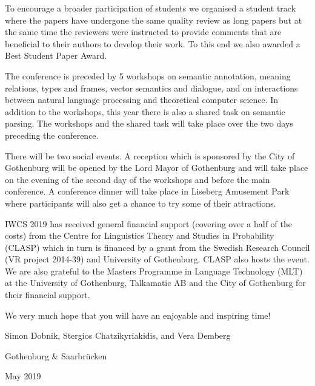 \documentclass[a4paper,11pt,oneside]{book}
\begin{document}
To encourage a broader participation of students we organised a
student track where the papers have undergone the same quality review
as long papers but at the same time the reviewers were instructed to
provide comments that are beneficial to their authors to develop their
work. To this end we also awarded a Best Student Paper Award.

The conference is preceded by 5 workshops on semantic annotation,
meaning relations, types and frames, vector semantics and dialogue,
and on interactions between natural language processing and
theoretical computer science. In addition to the workshops, this year
there is also a shared task on semantic parsing. The workshops and the
shared task will take place over the two days preceding the
conference.

There will be two social events. A reception which is sponsored by the City
of Gothenburg will be opened by the Lord Mayor of Gothenburg and will take
place on the evening of the second day of the workshops and before the
main conference. A conference dinner will take place in Liseberg
Amusement Park where participants will also get a chance to try some
of their attractions.

IWCS 2019 has received general financial support (covering over a half
of the costs) from the Centre for Linguistics Theory and Studies in
Probability (CLASP) which in turn is financed by a grant from the
Swedish Research Council (VR project 2014-39) and University of
Gothenburg. CLASP also hosts the event. We are also grateful to the
Masters Programme in Language Technology (MLT) at the University of
Gothenburg, Talkamatic AB and the City of Gothenburg for their
financial support.

We very much hope that you will have an enjoyable and inspiring time!

\vspace{20pt}
\hfill Simon Dobnik, Stergios Chatzikyriakidis, and Vera Demberg

\hfill Gothenburg \& Saarbrücken

\hfill May 2019

\clearpage



\vspace*{0.5cm}
\end{document}
